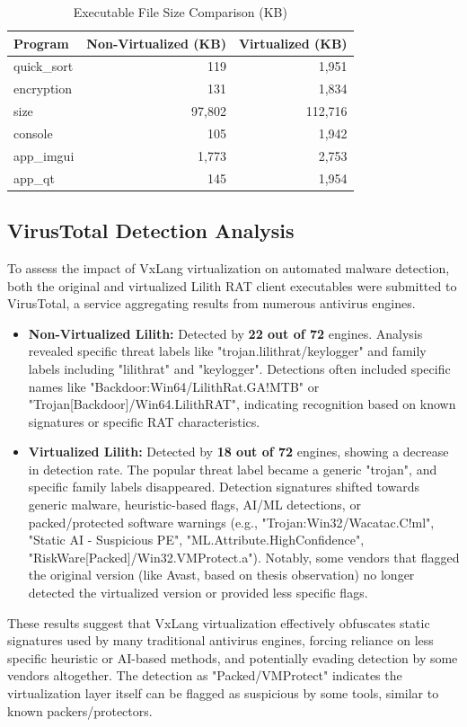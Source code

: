 \begin{table}[!t]
  \centering
  \caption{Executable File Size Comparison (KB)}
  \label{tab:file_size}
    \begin{tabular}{@{}lrr@{}}
        \toprule
        \textbf{Program} & \textbf{Non-Virtualized (KB)} & \textbf{Virtualized (KB)} \\
        \midrule
        quick\_sort      & 119        & 1,951      \\
        encryption       & 131        & 1,834      \\
        size             & 97,802     & 112,716    \\
        console          & 105        & 1,942      \\
        app\_imgui       & 1,773      & 2,753      \\
        app\_qt          & 145        & 1,954      \\
        \bottomrule
    \end{tabular}
\end{table}

\subsection{VirusTotal Detection Analysis}
To assess the impact of VxLang virtualization on automated malware detection, both the original and virtualized Lilith RAT client executables were submitted to VirusTotal, a service aggregating results from numerous antivirus engines.

\begin{itemize}
    \item \textbf{Non-Virtualized Lilith:} Detected by \textbf{22 out of 72} engines. Analysis revealed specific threat labels like "trojan.lilithrat/keylogger" and family labels including "lilithrat" and "keylogger". Detections often included specific names like "Backdoor:Win64/LilithRat.GA!MTB" or "Trojan[Backdoor]/Win64.LilithRAT", indicating recognition based on known signatures or specific RAT characteristics.
    \item \textbf{Virtualized Lilith:} Detected by \textbf{18 out of 72} engines, showing a decrease in detection rate. The popular threat label became a generic "trojan", and specific family labels disappeared. Detection signatures shifted towards generic malware, heuristic-based flags, AI/ML detections, or packed/protected software warnings (e.g., "Trojan:Win32/Wacatac.C!ml", "Static AI - Suspicious PE", "ML.Attribute.HighConfidence", "RiskWare[Packed]/Win32.VMProtect.a"). Notably, some vendors that flagged the original version (like Avast, based on thesis observation) no longer detected the virtualized version or provided less specific flags.
\end{itemize}
These results suggest that VxLang virtualization effectively obfuscates static signatures used by many traditional antivirus engines, forcing reliance on less specific heuristic or AI-based methods, and potentially evading detection by some vendors altogether. The detection as "Packed/VMProtect" indicates the virtualization layer itself can be flagged as suspicious by some tools, similar to known packers/protectors.


